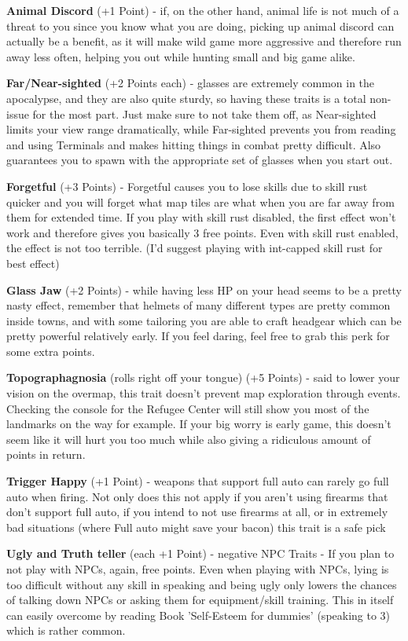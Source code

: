 \textbf{Animal Discord} (+1 Point) - if, on the other hand, animal life is not much of a threat to you since you know what you are doing, picking up animal discord can actually be a benefit, as it will make wild game more aggressive and therefore run away less often, helping you out while hunting small and big game alike.

\textbf{Far/Near-sighted} (+2 Points each) - glasses are extremely common in the apocalypse, and they are also quite sturdy, so having these traits is a total non-issue for the most part. Just make sure to not take them off, as Near-sighted limits your view range dramatically, while Far-sighted prevents you from reading and using Terminals and makes hitting things in combat pretty difficult. Also guarantees you to spawn with the appropriate set of glasses when you start out.

\textbf{Forgetful} (+3 Points) - Forgetful causes you to lose skills due to skill rust quicker and you will forget what map tiles are what when you are far away from them for extended time. If you play with skill rust disabled, the first effect won't work and therefore gives you basically 3 free points. Even with skill rust enabled, the effect is not too terrible. (I'd suggest playing with int-capped skill rust for best effect)

\textbf{Glass Jaw} (+2 Points) - while having less HP on your head seems to be a pretty nasty effect, remember that helmets of many different types are pretty common inside towns, and with some tailoring you are able to craft headgear which can be pretty powerful relatively early. If you feel daring, feel free to grab this perk for some extra points.

\textbf{Topographagnosia} (rolls right off your tongue) (+5 Points) - said to lower your vision on the overmap, this trait doesn't prevent map exploration through events. Checking the console for the Refugee Center will still show you most of the landmarks on the way for example. If your big worry is early game, this doesn't seem like it will hurt you too much while also giving a ridiculous amount of points in return.

\textbf{Trigger Happy} (+1 Point) - weapons that support full auto can rarely go full auto when firing. Not only does this not apply if you aren't using firearms that don't support full auto, if you intend to not use firearms at all, or in extremely bad situations (where Full auto might save your bacon) this trait is a safe pick

\textbf{Ugly and Truth teller} (each +1 Point) - negative NPC Traits - If you plan to not play with NPCs, again, free points. Even when playing with NPCs, lying is too difficult without any skill in speaking and being ugly only lowers the chances of talking down NPCs or asking them for equipment/skill training. This in itself can easily overcome by reading Book 'Self-Esteem for dummies' (speaking to 3) which is rather common.

